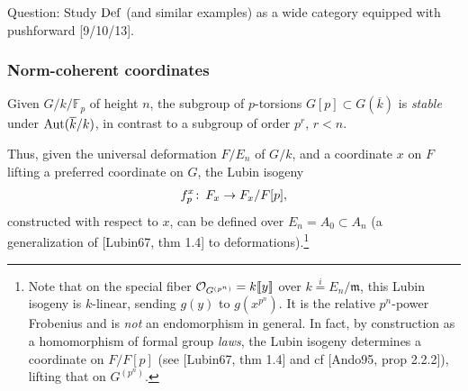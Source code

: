 \documentclass{rs}
\theoremstyle{definition}
\theoremstyle{remark}
\def\co{\colon\thinspace}
\newcommand{\mb}[1]{\mathbb{#1}}
\newcommand{\mf}[1]{\mathfrak{#1}}
\newcommand{\Aut}{{\rm Aut}}
\newcommand{\ck}{\overline k}
\newcommand{\CO}{{\cal O}}
\newcommand{\BF}{{\mb F}}
\newcommand{\Def}{{\rm Def}}
\newcommand{\lb}{\llbracket}
\newcommand{\rb}{\rrbracket}
\renewcommand{\=}{\approx}
\renewcommand{\-}{\sim}
\numberwithin{equation}{section}
\numberwithin{thm}{section}
\begin{document}
Question: Study $\Def$ (and similar examples) as a wide category equipped with pushforward [9/10/13].  


\subsubsection{Norm-coherent coordinates}

Given $G/k/\BF_p$ of height $n$, 
the subgroup of $p$-torsions $G[p] \subset G(\ck)$ is 
{\em stable} under $\Aut(\ck / k)$, in contrast to a subgroup of order $p^r$, $r<n$.  

Thus, given the universal deformation $F / E_n$ of $G / k$, 
and a coordinate $x$ on $F$ lifting a preferred coordinate on $G$, 
the Lubin isogeny 
\[
 f_p^x \co F_x \to F_x / F[p], 
\]
constructed with respect to $x$, can be defined over $E_n = A_0 \subset A_n$ 
(a generalization of [Lubin67, thm 1.4] to deformations).\footnote{Note that 
on the special fiber $\CO_{G^{(p^n)}} = k \lb y \rb$ over $k \stackrel{i}{=} E_n / {\mf m}$, 
this Lubin isogeny is $k$-linear, sending $g(y)$ to $g(x^{p^n})$.  
It is the relative $p^n$-power Frobenius 
and is {\em not} an endomorphism in general.  
In fact, by construction as a homomorphism of formal group {\em laws}, 
the Lubin isogeny determines a coordinate on $F/F[p]$ 
(see [Lubin67, thm 1.4] and cf [Ando95, prop 2.2.2]), lifting that on $G^{(p^n)}$.  }  
\end{document}
